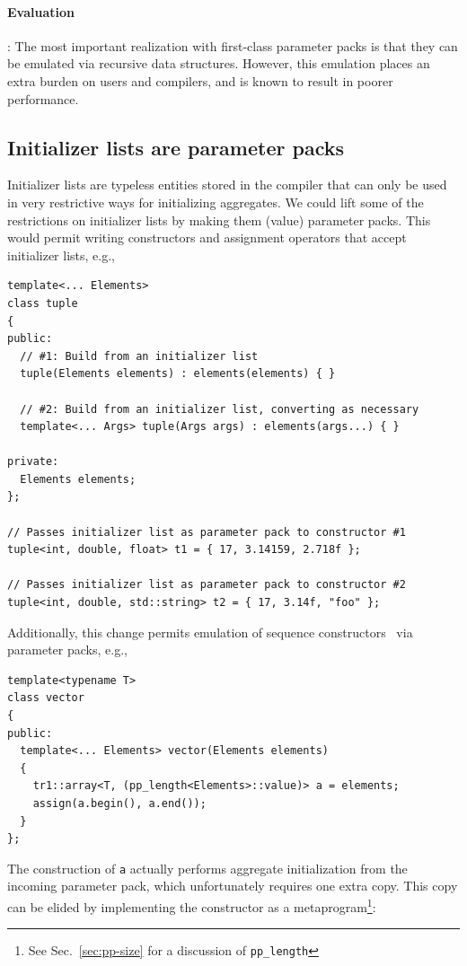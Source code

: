 \documentclass{article}
\begin{document}
\paragraph{Evaluation}: The most important realization with
first-class parameter packs is that they can be emulated via recursive
data structures. However, this emulation places an extra burden on
users and compilers, and is known to result in poorer performance.

\subsection{Initializer lists are parameter packs}
Initializer lists are typeless entities stored in the compiler that
can only be used in very restrictive ways for initializing
aggregates. We could lift some of the restrictions on initializer
lists by making them (value) parameter packs. This would permit writing
constructors and assignment operators that accept initializer lists,
e.g.,

\begin{verbatim}
template<... Elements>
class tuple
{
public:
  // #1: Build from an initializer list
  tuple(Elements elements) : elements(elements) { }

  // #2: Build from an initializer list, converting as necessary
  template<... Args> tuple(Args args) : elements(args...) { }

private:
  Elements elements;
};

// Passes initializer list as parameter pack to constructor #1
tuple<int, double, float> t1 = { 17, 3.14159, 2.718f };
  
// Passes initializer list as parameter pack to constructor #2
tuple<int, double, std::string> t2 = { 17, 3.14f, "foo" };
\end{verbatim}

Additionally, this change permits emulation of sequence
constructors~\cite{DoReStr03} via parameter packs, e.g.,
\begin{verbatim}
template<typename T>
class vector
{
public:
  template<... Elements> vector(Elements elements)
  {
    tr1::array<T, (pp_length<Elements>::value)> a = elements;
    assign(a.begin(), a.end());
  }
};
\end{verbatim}

The construction of \texttt{a} actually performs aggregate
initialization from the incoming parameter pack, which unfortunately
requires one extra copy. This copy can be elided by implementing the
constructor as a metaprogram\footnote{See Sec.~\ref{sec:pp-size} for a
  discussion of \texttt{pp\_length}}:
\end{document}
